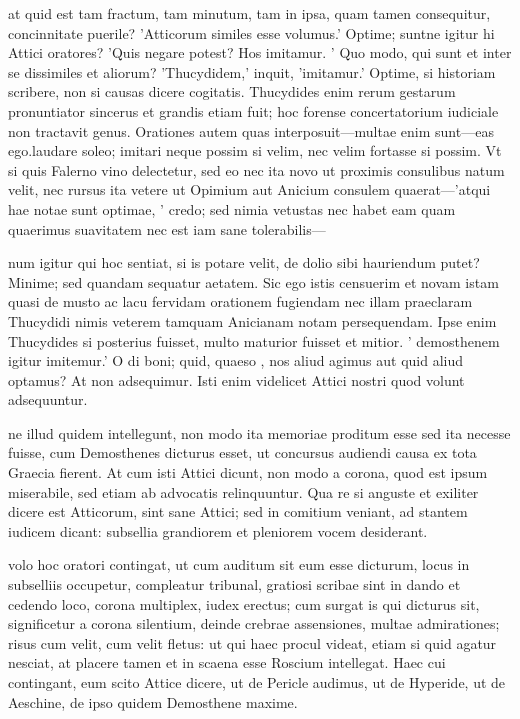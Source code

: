  at quid est tam fractum, tam minutum, tam in ipsa, quam tamen consequitur, concinnitate puerile? 'Atticorum similes esse volumus.' Optime; suntne igitur hi Attici oratores? 'Quis negare potest? Hos imitamur. ' Quo modo, qui sunt et inter se dissimiles et aliorum? 'Thucydidem,' inquit, 'imitamur.' Optime, si historiam scribere, non si causas dicere cogitatis. Thucydides enim rerum gestarum pronuntiator sincerus et grandis etiam fuit; hoc forense concertatorium iudiciale non tractavit genus. Orationes autem quas interposuit—multae enim sunt—eas ego.laudare soleo; imitari neque possim si velim, nec velim fortasse si possim. Vt si quis Falerno vino delectetur, sed eo nec ita novo ut proximis consulibus natum velit, nec rursus ita vetere ut Opimium aut Anicium consulem quaerat—'atqui hae notae sunt optimae, ' credo; sed nimia vetustas nec habet eam quam quaerimus suavitatem nec est iam sane tolerabilis—

 num igitur qui hoc sentiat, si is potare velit, de dolio sibi hauriendum putet? Minime; sed quandam sequatur aetatem. Sic ego istis censuerim et novam istam quasi de musto ac lacu fervidam orationem fugiendam nec illam praeclaram Thucydidi nimis veterem tamquam Anicianam notam persequendam. Ipse enim Thucydides si posterius fuisset, multo maturior fuisset et mitior. ' demosthenem igitur imitemur.' O di boni; quid, quaeso , nos aliud agimus aut quid aliud optamus? At non adsequimur. Isti enim videlicet Attici nostri quod volunt adsequuntur.

 ne illud quidem intellegunt, non modo ita memoriae proditum esse sed ita necesse fuisse, cum Demosthenes dicturus esset, ut concursus audiendi causa ex tota Graecia fierent. At cum isti Attici dicunt, non modo a corona, quod est ipsum miserabile, sed etiam ab advocatis relinquuntur. Qua re si anguste et exiliter dicere est Atticorum, sint sane Attici; sed in comitium veniant, ad stantem iudicem dicant: subsellia grandiorem et pleniorem vocem desiderant.

 volo hoc oratori contingat, ut cum auditum sit eum esse dicturum, locus in subselliis occupetur, compleatur tribunal, gratiosi scribae sint in dando et cedendo loco, corona multiplex, iudex erectus; cum surgat is qui dicturus sit, significetur a corona silentium, deinde crebrae assensiones, multae admirationes; risus cum velit, cum velit fletus: ut qui haec procul videat, etiam si quid agatur nesciat, at placere tamen et in scaena esse Roscium intellegat. Haec cui contingant, eum scito Attice dicere, ut de Pericle audimus, ut de Hyperide, ut de Aeschine, de ipso quidem Demosthene maxime.

